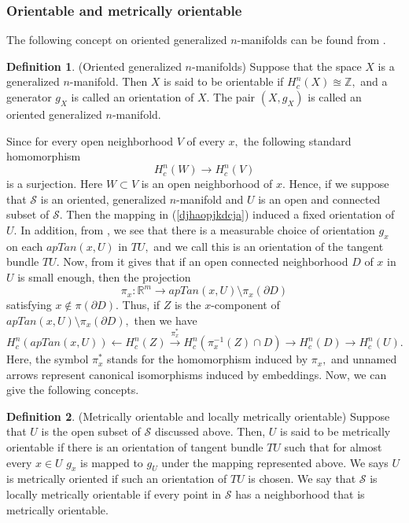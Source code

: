 \documentclass[11pt,twoside]{article}
\theoremstyle{definition}
\newtheorem{defn}{Definition}[section]
\theoremstyle{remark}
\begin{document}
 \subsubsection{Orientable and metrically orientable}
 The following concept on oriented generalized $n$-manifolds can be found from  \cite[Section 2]{HS02}.
\begin{defn}\cite{HS02}(Oriented generalized $n$-manifolds)
Suppose that the space $X$ is a generalized $n$-manifold. Then $X$ is said to be orientable if $H_{c}^{n}(X)\approxeq\mathbb{Z},$ and a generator $g_{X}$ is called an orientation of $X.$ The pair $(X, g_{X})$ is called an oriented generalized $n$-manifold. 
\end{defn}
 Since for every open neighborhood $V$ of every $x,$ the following standard homomorphism
 \begin{equation}\label{djhaopjkdcja}
 H_{c}^{n}(W)\rightarrow H_{c}^{n}(V)
 \end{equation} 
  is a surjection. Here $W\subset V$ is an open neighborhood of $x.$ Hence, if we suppose that $\mathcal{S}$ is an oriented, generalized $n$-manifold and  $U$ is an open and  connected subset of $\mathcal{S}.$ Then the mapping in (\ref{djhaopjkdcja})  induced a fixed orientation of
  $U.$ In addition,  from  \cite[Lemma 3.2.25]{Fed69}, we see that there is a measurable choice of orientation $g_{x}$  on each $apTan(x,U)$ in $TU,$ and we call this is an orientation of the tangent bundle $TU.$
Now, from  \cite[Remark 2.14]{Kir14} it gives that if an open connected neighborhood $D$ of $x$ in $U$ is small enough, then the projection $$\pi_{x}: \mathbb{R}^{m}\rightarrow apTan(x,U)
\setminus\pi_{x}(\partial D)$$ satisfying $x\notin\pi(\partial D).$ Thus, if $Z$ is the $x$-component of $apTan(x,U)\setminus\pi_{x}(\partial D),$ then we have
\begin{equation}\label{djaihd}
H_{c}^{n}(apTan(x,U))\leftarrow H_{c}^{n}(Z)\stackrel{\pi_{x}^{*}}{\longrightarrow}H_{c}^{n}(\pi_{x}^{-1}(Z)\cap D)\rightarrow H_{c}^{n}(D)\rightarrow H_{c}^{n}(U).
\end{equation}
 Here, the symbol $\pi_{x}^{*}$ stands for  the homomorphism induced by $\pi_{x},$ and unnamed arrows represent canonical isomorphisms induced by embeddings. Now,  we can give the following concepts.
 \begin{defn}{\rm\cite{HK11,HR02,HS02}}(Metrically orientable and  locally metrically orientable)
Suppose that $U$ is the open subset of $\mathcal{S}$ discussed above. Then, $U$ is said to be  metrically orientable if there is an orientation of tangent bundle $TU$ such that for almost every
 $x\in U$ $g_{x}$ is mapped to $g_{U}$ under the mapping represented above. We says $U$ is metrically oriented if such an orientation of $TU$ is chosen.  We say that $\mathcal{S}$ is locally metrically 
 orientable if every point in $\mathcal{S}$  has a neighborhood that is metrically orientable. 
\end{defn}
 
\end{document}
